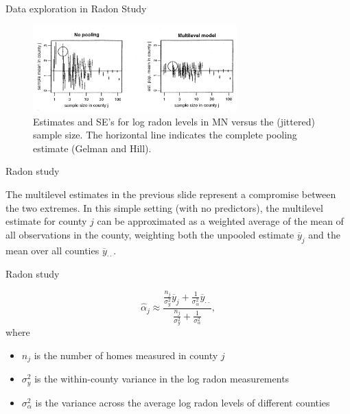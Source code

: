 \documentclass[ignorenonframetext,]{beamer}
\begin{document}
\begin{frame}{Data exploration in Radon Study}

\begin{figure}
\centering
\includegraphics[width=0.70000\textwidth]{figures/gelman1.jpg}
\caption{Estimates and SE's for log radon levels in MN versus the
(jittered) sample size. The horizontal line indicates the complete
pooling estimate (Gelman and Hill).}
\end{figure}

\end{frame}

\begin{frame}{Radon study}

The multilevel estimates in the previous slide represent a compromise
between the two extremes. In this simple setting (with no predictors),
the multilevel estimate for county \(j\) can be approximated as a
weighted average of the mean of all observations in the county,
weighting both the unpooled estimate \(\overline{y}_j\) and the mean
over all counties \(\overline{y}_{\cdot \cdot}\).

\end{frame}

\begin{frame}{Radon study}

\[\widehat{\alpha}_j \approx
\frac{\frac{n_j}{\sigma^2_y}\overline{y}_j+\frac{1}{\sigma^2_{\alpha}}\overline{y}_{\cdot\cdot}}{\frac{n_j}{\sigma^2_y}+\frac{1}{\sigma^2_{\alpha}}},\]
where

\begin{itemize}
\item
  \(n_j\) is the number of homes measured in county \(j\)
\item
  \(\sigma^2_y\) is the within-county variance in the log radon
  measurements
\item
  \(\sigma^2_{\alpha}\) is the variance across the average log radon
  levels of different counties
\end{itemize}

\end{frame}
\end{document}
